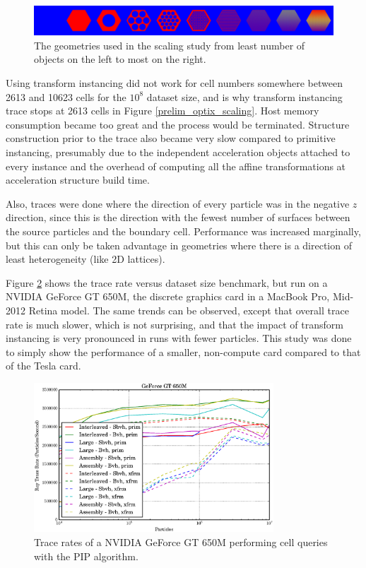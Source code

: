 \begin{figure}[h!] 
  \centering
    \includegraphics[width=1.0\textwidth]{graphics/prelim/prelim_scaling_geom.png}
     \caption{The geometries used in the scaling study from least number of objects on the left to most on the right. \label{prelim_scaling_geom} }
\end{figure}

Using transform instancing did not work for cell numbers somewhere between 2613 and 10623 cells for the $10^8$ dataset size, and is why transform instancing trace stops at 2613 cells in Figure \ref{prelim_optix_scaling}.   Host memory consumption became too great and the process would be terminated.  Structure construction prior to the trace also became very slow compared to primitive instancing, presumably due to the independent acceleration objects attached to every instance and the overhead of computing all the affine transformations at acceleration structure build time.

Also, traces were done where the direction of every particle was in the negative $z$ direction, since this is the direction with the fewest number of surfaces between the source particles and the boundary cell.  Performance was increased marginally, but this can only be taken advantage in geometries where there is a direction of least heterogeneity (like 2D lattices).

Figure \ref{prelim_optix_G650M} shows the trace rate versus dataset size benchmark, but run on a NVIDIA GeForce GT 650M, the discrete graphics card in a MacBook Pro, Mid-2012 Retina model.  The same trends can be observed, except that overall trace rate is much slower, which is not surprising, and that the impact of transform instancing is very pronounced in runs with fewer particles.  This study was done to simply show the performance of a smaller, non-compute card compared to that of the Tesla card.

\begin{figure}[h!] 
  \centering
    \includegraphics[width=0.8\textwidth]{graphics/prelim_optix_G650M.eps}
     \caption{Trace rates of a NVIDIA GeForce GT 650M performing cell queries with the PIP algorithm. \label{prelim_optix_G650M} }
\end{figure}

